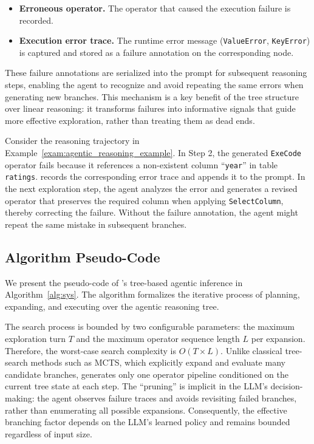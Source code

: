 \begin{itemize}[leftmargin=*]
    \item \textbf{Erroneous operator.} The operator that caused the execution failure is recorded.
    \item \textbf{Execution error trace.} The runtime error message (\eg \texttt{ValueError}, \texttt{KeyError}) is captured and stored as a failure annotation on the corresponding node.
\end{itemize}

These failure annotations are serialized into the prompt for subsequent reasoning steps, enabling the agent to recognize and avoid repeating the same errors when generating new branches. This mechanism is a key benefit of the tree structure over linear reasoning: it transforms failures into informative signals that guide more effective exploration, rather than treating them as dead ends.

\begin{example}
\label{exam:failed_branch_reuse}
Consider the reasoning trajectory in Example~\ref{exam:agentic_reasoning_example}. In Step 2, the generated \texttt{ExeCode} operator fails because it references a non-existent column ``\texttt{year}'' in table \texttt{ratings}. \sys records the corresponding error trace and appends it to the prompt. In the next exploration step, the agent analyzes the error and generates a revised operator that preserves the required column when applying \texttt{SelectColumn}, thereby correcting the failure. Without the failure annotation, the agent might repeat the same mistake in subsequent branches.
\end{example}

\subsection{Algorithm Pseudo-Code}
\label{subsec:appendix_algorithm}

We present the pseudo-code of \sys's tree-based agentic inference in Algorithm~\ref{alg:sys}. The algorithm formalizes the iterative process of planning, expanding, and executing over the agentic reasoning tree.


The search process is bounded by two configurable parameters: the maximum exploration turn $T$ and the maximum operator sequence length $L$ per expansion. Therefore, the worst-case search complexity is $O(T \times L)$. Unlike classical tree-search methods such as MCTS, which explicitly expand and evaluate many candidate branches, \sys generates only one operator pipeline conditioned on the current tree state at each step. The ``pruning'' is implicit in the LLM's decision-making: the agent observes failure traces and avoids revisiting failed branches, rather than enumerating all possible expansions. Consequently, the effective branching factor depends on the LLM's learned policy and remains bounded regardless of input size.

